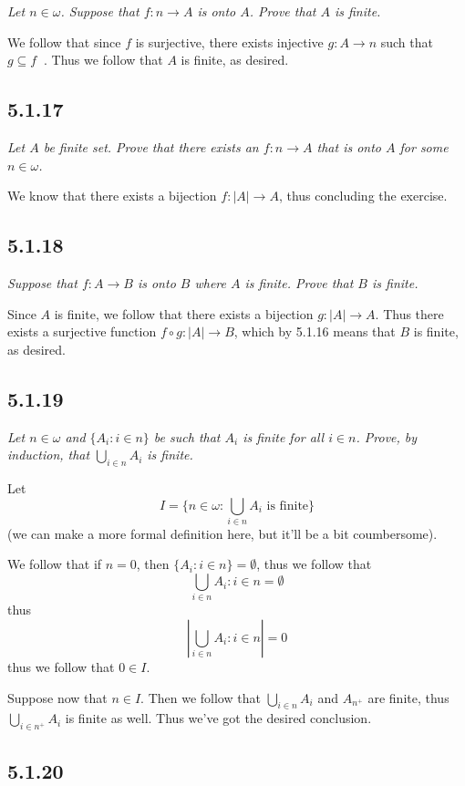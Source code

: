 \documentclass[11pt,oneside,titlepage]{book}
\DeclareMathOperator \inv {^{-1}}
\begin{document}
\textit{Let $n \in \omega$. Suppose that $f: n \to A$ is onto $A$. Prove that $A$ is finite.}

We follow that since $f$ is surjective, there exists injective $g: A \to n$ such that
$g \subseteq f\inv$. Thus we follow that $A$ is finite, as desired.

\subsection*{5.1.17}

\textit{Let $A$ be finite set. Prove that there exists an $f: n \to A$ that is onto $A$
  for some $n \in \omega$.}

We know that there exists a bijection $f: |A| \to A$, thus concluding the exercise.

\subsection*{5.1.18}

\textit{Suppose that $f: A \to B$ is onto $B$ where $A$ is finite. Prove that $B$ is finite.}

Since $A$ is finite, we follow that there exists a bijection $g: |A| \to A$. Thus there
exists a surjective function $f \circ g : |A| \to B$, which by 5.1.16 means that $B$ is finite,
as desired.

\subsection*{5.1.19}

\textit{Let $n \in \omega$ and $\{A_i: i \in n\}$ be such that $A_i$ is finite for all
  $i \in n$. Prove, by induction, that $\bigcup_{i \in n}{A_i}$ is finite.}

Let
$$I = \{n \in \omega: \bigcup_{i \in n}{A_i} \text{ is finite}\}$$
(we can make a more formal definition here, but it'll be a bit coumbersome).

We follow that if $n = 0$, then $\{A_i: i \in n\} = \emptyset$, thus we follow that
$$\bigcup_{i \in n}{A_i: i \in n} = \emptyset$$
thus
$$|\bigcup_{i \in n}{A_i: i \in n}| = 0$$
thus we follow that $0 \in I$.

Suppose now that $n \in I$. Then we follow that $\bigcup_{i \in n}{A_i}$ and $A_{n^+}$ are finite,
thus $\bigcup_{i \in n^+}{A_i}$ is finite as well. Thus we've got the desired conclusion.

\subsection*{5.1.20}
\end{document}

